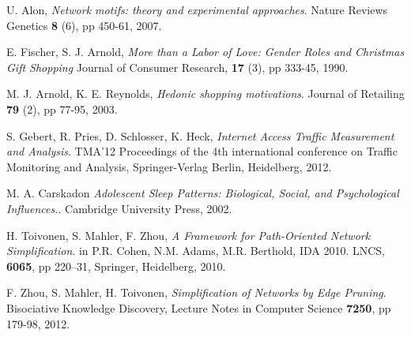 \begin{thebibliography}{99}
  U. Alon,
  \emph{Network motifs: theory and experimental approaches}.
  Nature Reviews Genetics \textbf{8} (6), pp 450-61,
  2007.
  
  E. Fischer, S. J. Arnold,
  \emph{More than a Labor of Love: Gender Roles and Christmas Gift Shopping}
  Journal of Consumer Research, \textbf{17} (3), pp 333-45,
  1990.

  M. J. Arnold, K. E. Reynolds,
  \emph{Hedonic shopping motivations}.
  Journal of Retailing \textbf{79} (2), pp 77-95,
  2003.

  S. Gebert, R. Pries, D. Schlosser, K. Heck,
  \emph{Internet Access Traffic Measurement and Analysis}.
  TMA'12 Proceedings of the 4th international conference on Traffic Monitoring and Analysis,
  Springer-Verlag Berlin, Heidelberg,
  2012.

  M. A. Carskadon
  \emph{Adolescent Sleep Patterns: Biological, Social, and Psychological Influences.}.
  Cambridge University Press,
  2002.

  H. Toivonen, S. Mahler, F. Zhou,
  \emph{A Framework for Path-Oriented Network Simplification}.
  in P.R. Cohen, N.M. Adams, M.R. Berthold,
  IDA 2010. LNCS, \textbf{6065}, pp 220–31,
  Springer, Heidelberg,
  2010.

  F. Zhou, S. Mahler, H. Toivonen,
  \emph{Simplification of Networks by Edge Pruning}.
  Bisociative Knowledge Discovery,
  Lecture Notes in Computer Science \textbf{7250}, pp 179-98,
  2012.

\end{thebibliography}
